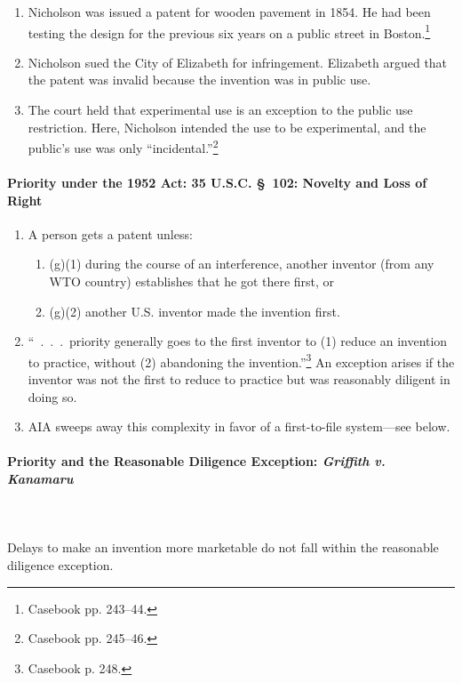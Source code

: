 \begin{enumerate}
    \item Nicholson was issued a patent for wooden pavement in 1854. He had been 
    testing the design for the previous six years on a public street in 
    Boston.\footnote{Casebook pp. 243--44.}
    \item Nicholson sued the City of Elizabeth for infringement. Elizabeth 
    argued that the patent was invalid because the invention was in public use.
    \item The court held that experimental use is an exception to the public use 
    restriction. Here, Nicholson intended the use to be experimental, and the 
    public's use was only ``incidental.''\footnote{Casebook pp. 245--46.}
\end{enumerate}

\paragraph{Priority under the 1952 Act: 35 U.S.C. \S\ 102: Novelty and Loss of 
Right}

\begin{enumerate}
    \item A person gets a patent unless:
    \begin{enumerate}
        \item (g)(1) during the course of an interference, another inventor (from 
        any WTO country) establishes that he got there first, or
        \item (g)(2) another U.S. inventor made the invention first.
    \end{enumerate}
    \item ``~.~.~.~priority generally goes to the first inventor to (1) reduce 
    an invention to practice, without (2) abandoning the 
    invention.''\footnote{Casebook p. 248.} An exception arises if the inventor 
    was not the first to reduce to practice but was reasonably diligent in doing 
    so.
    \item AIA sweeps away this complexity in favor of a first-to-file 
    system---see below. 
\end{enumerate}

\paragraph{Priority and the Reasonable Diligence Exception: \emph{Griffith v. 
Kanamaru}}
~\\\\
Delays to make an invention more marketable do not fall within the reasonable 
diligence exception.

